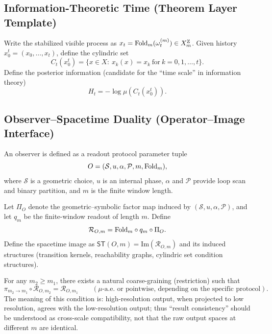 \subsection{Information-Theoretic Time (Theorem Layer Template)}

\begin{definition}\label{def:cyl}
Write the stabilized visible process as $x_t=\mathrm{Fold}_m(\omega_t^{(m)})\in X_m^{\mathrm Z}$.
Given history $x_0^t=(x_0,\dots,x_t)$, define the cylindric set
\[
C_t(x_0^t)=\{x\in X:\ x_k(x)=x_k\ \text{for}\ k=0,1,\dots,t\}.
\]
Define the posterior information (candidate for the ``time scale'' in information theory)
\[
H_t=-\log\mu(C_t(x_0^t)).
\]
\end{definition}

\subsection{Observer--Spacetime Duality (Operator--Image Interface)}

\begin{definition}\label{def:observer-protocol-spec}
An observer is defined as a readout protocol parameter tuple
$$
O=(\mathcal{S},u,\alpha,\mathcal{P},m,\mathrm{Fold}_m),
$$
where $\mathcal{S}$ is a geometric choice, $u$ is an internal phase, $\alpha$ and $\mathcal{P}$ provide loop scan and binary partition, and $m$ is the finite window length.
\end{definition}

\begin{definition}\label{def:readout-and-image-spec}
Let $\Pi_O$ denote the geometric--symbolic factor map induced by $(\mathcal{S},u,\alpha,\mathcal{P})$, and let $q_m$ be the finite-window readout of length $m$. Define
$$
\mathcal{R}_{O,m}=\mathrm{Fold}_m\circ q_m\circ \Pi_O.
$$
Define the spacetime image as $\mathsf{ST}(O,m)=\mathrm{Im}(\mathcal{R}_{O,m})$ and its induced structures (transition kernels, reachability graphs, cylindric set condition structures).
\end{definition}

\begin{assumption}\label{assump:readout-factorization}
For any $m_2\ge m_1$, there exists a natural coarse-graining (restriction) such that
\[
\pi_{m_2\to m_1}\circ \mathcal{R}_{O,m_2}=\mathcal{R}_{O,m_1}\qquad (\mu\text{-a.e. or pointwise, depending on the specific protocol}).
\]
The meaning of this condition is: high-resolution output, when projected to low resolution, agrees with the low-resolution output; thus ``result consistency'' should be understood as cross-scale compatibility, not that the raw output spaces at different $m$ are identical.
\end{assumption}

